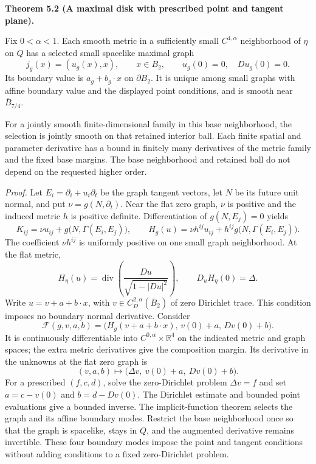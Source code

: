 \documentclass[
  english,
  11pt,
  reqno]{amsart}
\makeatletter
\newcommand{\pandocstatementheading}[1]{%
  \par\if@nobreak\else
    \addpenalty{\@beginparpenalty}%
    \addvspace{.5\baselineskip plus .2\baselineskip minus .2\baselineskip}%
  \fi
  {\normalfont\bfseries #1\par}%
  \nobreak\@afterindenttrue\@afterheading
}
\makeatother
\begin{document}
\pandocstatementheading{\leavevmode{}\label{thm:submission-marked-maximal-disk}Theorem 5.2 (A maximal disk with prescribed point and tangent plane).}

Fix \(0<\alpha<1\). Each smooth metric in a sufficiently small
\(C^{4,\alpha}\) neighborhood of \(\eta\) on \(Q\) has a selected small
spacelike maximal graph%
 \[
j_g(x)=(u_g(x),x),
\qquad
x\in B_2,
\qquad
u_g(0)=0,\quad Du_g(0)=0.
\] Its boundary value is \(a_g+b_g\cdot x\) on \(\partial B_2\). It is
unique among small graphs with affine boundary value and the displayed
point conditions, and is smooth near \(\overline B_{7/4}\).

For a jointly smooth finite-dimensional family in this base
neighborhood, the selection is jointly smooth on that retained interior
ball. Each finite spatial and parameter derivative has a bound in
finitely many derivatives of the metric family and the fixed base
margins. The base neighborhood and retained ball do not depend on the
requested higher order.

\emph{Proof.} Let \(E_i=\partial_i+u_i\partial_t\) be the graph tangent
vectors, let \(N\) be its future unit normal, and put
\(\nu=g(N,\partial_t)\). Near the flat zero graph, \(\nu\) is positive
and the induced metric \(h\) is positive definite. Differentiation of
\(g(N,E_j)=0\) yields%
 \[
K_{ij}
=
\nu u_{ij}+g\bigl(N,\Gamma(E_i,E_j)\bigr),
\qquad
H_g(u)
=
\nu h^{ij}u_{ij}
+h^{ij}g\bigl(N,\Gamma(E_i,E_j)\bigr).
\] The coefficient \(\nu h^{ij}\) is uniformly positive on one small
graph neighborhood. At the flat metric,%
 \[
H_\eta(u)
=
\operatorname{div}\left(
\frac{Du}{\sqrt{1-|Du|^2}}
\right),
\qquad
D_uH_\eta(0)=\Delta.
\] Write \(u=v+a+b\cdot x\), with \(v\in C_D^{2,\alpha}(\overline B_2)\)
of zero Dirichlet trace. This condition imposes no boundary normal
derivative. Consider%
 \[
\mathcal F(g,v,a,b)
=
\bigl(
H_g(v+a+b\cdot x),\,
v(0)+a,\,
Dv(0)+b
\bigr).
\] It is continuously differentiable into
\(C^{0,\alpha}\times\mathbb R^4\) on the indicated metric and graph
spaces; the extra metric derivatives give the composition margin. Its
derivative in the unknowns at the flat zero graph is%
 \[
(v,a,b)
\longmapsto
\bigl(\Delta v,\ v(0)+a,\ Dv(0)+b\bigr).
\] For a prescribed \((f,c,d)\), solve the zero-Dirichlet problem
\(\Delta v=f\) and set \(a=c-v(0)\) and \(b=d-Dv(0)\). The Dirichlet
estimate and bounded point evaluations give a bounded inverse. The
implicit-function theorem selects the graph and its affine boundary
modes. Restrict the base neighborhood once so that the graph is
spacelike, stays in \(Q\), and the augmented derivative remains
invertible. These four boundary modes impose the point and tangent
conditions without adding conditions to a fixed zero-Dirichlet problem.
\end{document}
